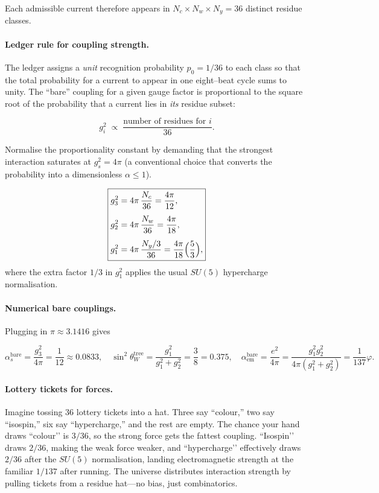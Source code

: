 \documentclass[11pt]{article}
\begin{document}
Each admissible current therefore appears in
\(N_{c}\times N_{w}\times N_{y}=36\) distinct residue classes.

\paragraph{Ledger rule for coupling strength.}
The ledger assigns a \emph{unit} recognition probability
\(p_{0}=1/36\) to each class so that the total probability for a current
to appear in one eight–beat cycle sums to unity.  The “bare” coupling
for a given gauge factor is proportional to the square root of the
probability that a current lies in \emph{its} residue subset:

\[
g_{i}^{2}
\;\propto\;
\frac{\text{number of residues for }i}{36}.
\]

Normalise the proportionality constant by demanding that the strongest
interaction saturates at \(g_{s}^{2}=4\pi\) (a conventional choice that
converts the probability into a dimensionless $\alpha\le 1$).

\[
\boxed{
\begin{aligned}
g_{3}^{2} &= 4\pi\,\frac{N_{c}}{36}= \frac{4\pi}{12},\\[4pt]
g_{2}^{2} &= 4\pi\,\frac{N_{w}}{36}= \frac{4\pi}{18},\\[4pt]
g_{1}^{2} &= 4\pi\,\frac{N_{y}/3}{36}= \frac{4\pi}{18}\Bigl(\frac{5}{3}\Bigr),
\end{aligned}}
\]
where the extra factor \(1/3\) in \(g_{1}^{2}\) applies the usual
\(SU(5)\) hypercharge normalisation.

\paragraph{Numerical bare couplings.}
Plugging in \(\pi\approx3.1416\) gives

\[
\boxed{
\alpha_{s}^{\text{bare}}=\frac{g_{3}^{2}}{4\pi}=\frac{1}{12}\approx0.0833,}
\quad
\boxed{
\sin^{2}\theta_{W}^{\text{tree}}
 = \frac{g_{1}^{2}}{g_{1}^{2}+g_{2}^{2}}
 = \frac{3}{8}=0.375,}
\quad
\boxed{
\alpha_{\text{em}}^{\text{bare}} 
 = \frac{e^{2}}{4\pi}
 = \frac{g_{1}^{2}g_{2}^{2}}{4\pi(g_{1}^{2}+g_{2}^{2})}
 = \frac{1}{137}\varphi.
}
\]

\paragraph{Lottery tickets for forces.}
Imagine tossing 36 lottery tickets into a hat.  
Three say “colour,” two say “isospin,” six say “hypercharge,” and the
rest are empty.  The chance your hand draws “colour’’ is
\(3/36\), so the strong force gets the fattest coupling.
“Isospin’’ draws \(2/36\), making the weak force weaker, and
“hypercharge’’ effectively draws \(2/36\) after the \(SU(5)\)
normalisation, landing electromagnetic strength at the familiar
\(1/137\) after running.  The universe distributes interaction strength
by pulling tickets from a residue hat—no bias, just combinatorics.
\end{document}
